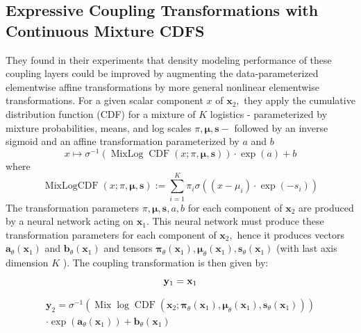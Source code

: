 \documentclass[]{IEEEtran}
\begin{document}
\subsection{Expressive Coupling Transformations with Continuous Mixture CDFS}

They found in their experiments that density modeling performance of these coupling layers could be improved by augmenting the data-parameterized elementwise affine transformations by more general nonlinear elementwise transformations. For a given scalar component $x$ of $\mathbf{x}_{2},$ they apply the cumulative distribution function (CDF) for a mixture of $K$ logistics - parameterized by mixture probabilities, means, and log scales $\pi, \boldsymbol{\mu}, \mathbf{s}-$ followed by an inverse sigmoid and an affine transformation parameterized by $a$ and $b$
\begin{equation}
x \longmapsto \sigma^{-1}(\operatorname{MixLog} \operatorname{CDF}(x ; \pi, \boldsymbol{\mu}, \mathbf{s})) \cdot \exp (a)+b
\label{fpp17}
\end{equation}
where
\begin{equation}
\operatorname{MixLogCDF}(x ; \pi, \boldsymbol{\mu}, \mathbf{s}):=\sum_{i=1}^{K} \pi_{i} \sigma\left(\left(x-\mu_{i}\right) \cdot \exp \left(-s_{i}\right)\right)
\label{fpp18}
\end{equation}
The transformation parameters $\pi, \boldsymbol{\mu}, \mathbf{s}, a, b$ for each component of $\mathbf{x}_{2}$ are produced by a neural network acting on $\mathbf{x}_{1} .$ This neural network must produce these transformation parameters for each component of $\mathbf{x}_{2},$ hence it produces vectors $\mathbf{a}_{\theta}\left(\mathbf{x}_{1}\right)$ and $\mathbf{b}_{\theta}\left(\mathbf{x}_{1}\right)$ and tensors $\boldsymbol{\pi}_{\theta}\left(\mathbf{x}_{1}\right), \boldsymbol{\mu}_{\theta}\left(\mathbf{x}_{1}\right), \mathbf{s}_{\theta}\left(\mathbf{x}_{1}\right)$
(with last axis dimension $K$ ). The coupling transformation is then given by:

\begin{equation}
\mathbf{y}_{1}=\mathbf{x}_{1} \\
\label{fpp19}
\end{equation}

\begin{multline}
\mathbf{y}_{2}=\sigma^{-1}\left(\operatorname{Mix} \log \operatorname{CDF}\left(\mathbf{x}_{2}; \boldsymbol{\pi}_{\theta}\left(\mathbf{x}_{1}\right), \boldsymbol{\mu}_{\theta}\left(\mathbf{x}_{1}\right),\mathbf{s}_{\theta}\left(\mathbf{x}_{1}\right)\right)\right)\\  
\cdot \exp \left(\mathbf{a}_{\theta}\left(\mathbf{x}_{1}\right)\right)+\mathbf{b}_{\theta}\left(\mathbf{x}_{1}\right)
\label{fpp20}
\end{multline}
\end{document}
